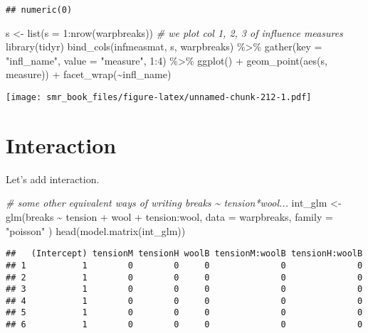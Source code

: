 \documentclass[
  oneside]{book}
\newenvironment{Shaded}{\begin{snugshade}}{\end{snugshade}}
\newcommand{\AttributeTok}[1]{\textcolor[rgb]{0.77,0.63,0.00}{#1}}
\newcommand{\CommentTok}[1]{\textcolor[rgb]{0.56,0.35,0.01}{\textit{#1}}}
\newcommand{\DecValTok}[1]{\textcolor[rgb]{0.00,0.00,0.81}{#1}}
\newcommand{\FunctionTok}[1]{\textcolor[rgb]{0.00,0.00,0.00}{#1}}
\newcommand{\NormalTok}[1]{#1}
\newcommand{\OtherTok}[1]{\textcolor[rgb]{0.56,0.35,0.01}{#1}}
\newcommand{\SpecialCharTok}[1]{\textcolor[rgb]{0.00,0.00,0.00}{#1}}
\newcommand{\StringTok}[1]{\textcolor[rgb]{0.31,0.60,0.02}{#1}}
\begin{document}
\begin{verbatim}
## numeric(0)
\end{verbatim}

\begin{Shaded}
\begin{Highlighting}[]
\NormalTok{s }\OtherTok{\textless{}{-}} \FunctionTok{list}\NormalTok{(}\AttributeTok{s =} \DecValTok{1}\SpecialCharTok{:}\FunctionTok{nrow}\NormalTok{(warpbreaks))}
\CommentTok{\# we plot col 1, 2, 3 of influence measures}
\FunctionTok{library}\NormalTok{(tidyr)}
\FunctionTok{bind\_cols}\NormalTok{(infmeasmat, s, warpbreaks) }\SpecialCharTok{\%\textgreater{}\%}
  \FunctionTok{gather}\NormalTok{(}\AttributeTok{key =} \StringTok{"infl\_name"}\NormalTok{, }\AttributeTok{value =} \StringTok{"measure"}\NormalTok{, }\DecValTok{1}\SpecialCharTok{:}\DecValTok{4}\NormalTok{) }\SpecialCharTok{\%\textgreater{}\%}
  \FunctionTok{ggplot}\NormalTok{() }\SpecialCharTok{+}
  \FunctionTok{geom\_point}\NormalTok{(}\FunctionTok{aes}\NormalTok{(s, measure)) }\SpecialCharTok{+}
  \FunctionTok{facet\_wrap}\NormalTok{(}\SpecialCharTok{\textasciitilde{}}\NormalTok{infl\_name)}
\end{Highlighting}
\end{Shaded}

\texttt{[image: smr\_book\_files/figure-latex/unnamed-chunk-212-1.pdf]}

\hypertarget{interaction}{%
\section{Interaction}\label{interaction}}

Let's add interaction.

\begin{Shaded}
\begin{Highlighting}[]
\CommentTok{\# some other equivalent ways of writing breaks \textasciitilde{} tension*wool...}
\NormalTok{int\_glm }\OtherTok{\textless{}{-}} \FunctionTok{glm}\NormalTok{(breaks }\SpecialCharTok{\textasciitilde{}}\NormalTok{ tension }\SpecialCharTok{+}\NormalTok{ wool }\SpecialCharTok{+}\NormalTok{ tension}\SpecialCharTok{:}\NormalTok{wool,}
  \AttributeTok{data =}\NormalTok{ warpbreaks, }\AttributeTok{family =} \StringTok{"poisson"}
\NormalTok{)}
\FunctionTok{head}\NormalTok{(}\FunctionTok{model.matrix}\NormalTok{(int\_glm))}
\end{Highlighting}
\end{Shaded}

\begin{verbatim}
##   (Intercept) tensionM tensionH woolB tensionM:woolB tensionH:woolB
## 1           1        0        0     0              0              0
## 2           1        0        0     0              0              0
## 3           1        0        0     0              0              0
## 4           1        0        0     0              0              0
## 5           1        0        0     0              0              0
## 6           1        0        0     0              0              0
\end{verbatim}
\end{document}
